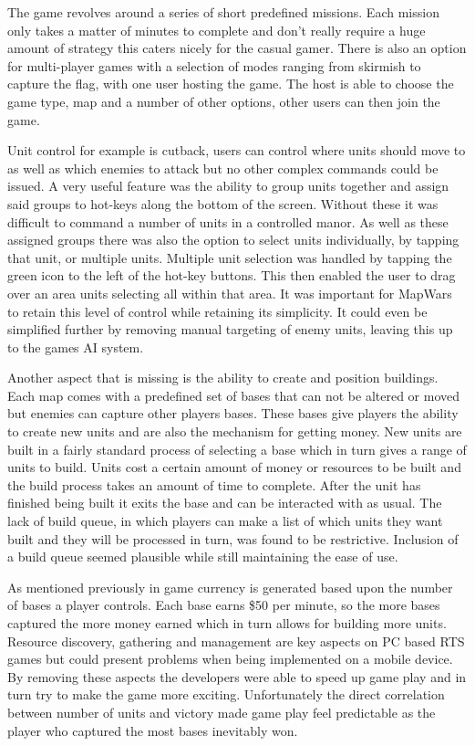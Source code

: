 The game revolves around a series of short predefined missions. Each mission only takes a matter of minutes to complete and don't really require a huge amount of strategy this caters nicely for the casual gamer. There is also an option for multi-player games with a selection of modes ranging from skirmish to capture the flag, with one user hosting the game. The host is able to choose the game type, map and a number of other options, other users can then join the game.

Unit control for example is cutback, users can control where units should move to as well as which enemies to attack but no other complex commands could be issued. A very useful feature was the ability to group units together and assign said groups to hot-keys along the bottom of the screen. Without these it was difficult to command a number of units in a controlled manor. As well as these assigned groups there was also the option to select units individually, by tapping that unit, or multiple units. Multiple unit selection was handled by tapping the green icon to the left of the hot-key buttons. This then enabled the user to drag over an area units selecting all within that area. It was important for MapWars to retain this level of control while retaining its simplicity. It could even be simplified further by removing manual targeting of enemy units, leaving this up to the games AI system.

Another aspect that is missing is the ability to create and position buildings. Each map comes with a predefined set of bases that can not be altered or moved but enemies can capture other players bases. These bases give players the ability to create new units and are also the mechanism for getting money. New units are built in a fairly standard process of selecting a base which in turn gives a range of units to build. Units cost a certain amount of money or resources to be built and the build process takes an amount of time to complete. After the unit has finished being built it exits the base and can be interacted with as usual. The lack of build queue, in which players can make a list of which units they want built and they will be processed in turn, was found to be restrictive. Inclusion of a build queue seemed plausible while still maintaining the ease of use.

As mentioned previously in game currency is generated based upon the number of bases a player controls. Each base earns \$50 per minute, so the more bases captured the more money earned which in turn allows for building more units. Resource discovery, gathering and management are key aspects on PC based RTS games but could present problems when being implemented on a mobile device. By removing these aspects the developers were able to speed up game play and in turn try to make the game more exciting. Unfortunately the direct correlation between number of units and victory made game play feel predictable as the player who captured the most bases inevitably won.

